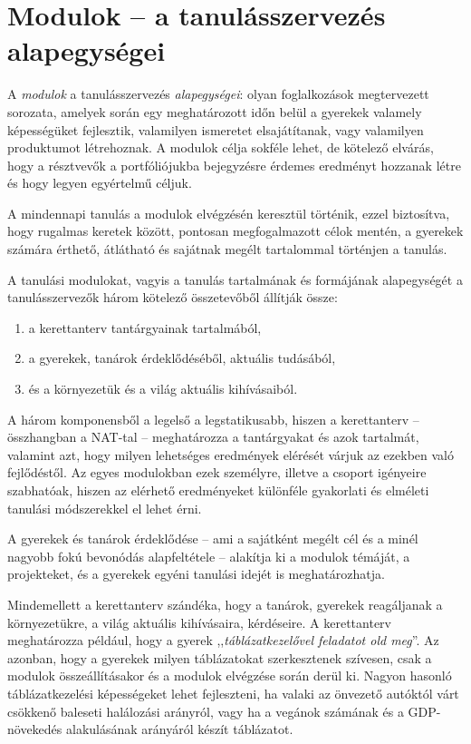 \section{Modulok -- a tanulásszervezés alapegységei}
\label{sec:modulok}

A \emph{modulok} a tanulásszervezés \emph{alapegységei}: olyan foglalkozások megtervezett sorozata, amelyek során egy meghatározott időn belül a gyerekek valamely képességüket fejlesztik, valamilyen ismeretet elsajátítanak, vagy valamilyen produktumot létrehoznak. A modulok célja sokféle lehet, de kötelező elvárás, hogy a résztvevők a portfóliójukba bejegyzésre érdemes eredményt hozzanak létre és hogy legyen egyértelmű céljuk.

A mindennapi tanulás a modulok elvégzésén keresztül történik, ezzel biztosítva, hogy rugalmas keretek között, pontosan megfogalmazott célok mentén, a gyerekek számára érthető, átlátható és sajátnak megélt tartalommal történjen a tanulás.

A tanulási modulokat, vagyis a tanulás tartalmának és formájának alapegységét a tanulásszervezők három kötelező összetevőből állítják össze:

\begin{enumerate}
      \item
            a kerettanterv tantárgyainak tartalmából,
      \item
            a gyerekek, tanárok érdeklődéséből, aktuális tudásából,
      \item
            és a környezetük és a világ aktuális kihívásaiból.
\end{enumerate}

A három komponensből a legelső a legstatikusabb, hiszen a kerettanterv -- összhangban a NAT-tal -- meghatározza a tantárgyakat és azok tartalmát, valamint azt, hogy milyen lehetséges eredmények elérését várjuk az ezekben való fejlődéstől. Az egyes modulokban ezek személyre, illetve a csoport igényeire szabhatóak, hiszen az elérhető eredményeket különféle gyakorlati és elméleti tanulási módszerekkel el lehet érni.

A gyerekek és tanárok érdeklődése -- ami a sajátként megélt cél és a minél nagyobb fokú bevonódás alapfeltétele -- alakítja ki a modulok témáját, a projekteket, és a gyerekek egyéni tanulási idejét is meghatározhatja.

Mindemellett a kerettanterv szándéka, hogy a tanárok, gyerekek reagáljanak a környezetükre, a világ aktuális kihívásaira, kérdéseire. A kerettanterv meghatározza például, hogy a gyerek ,,\emph{táblázatkezelővel feladatot old meg}''. Az azonban, hogy a gyerekek milyen táblázatokat szerkesztenek szívesen, csak a modulok összeállításakor és a modulok elvégzése során derül ki. Nagyon hasonló táblázatkezelési képességeket lehet fejleszteni, ha valaki az önvezető autóktól várt csökkenő baleseti halálozási arányról, vagy ha a vegánok számának és a GDP-növekedés alakulásának arányáról készít táblázatot.

